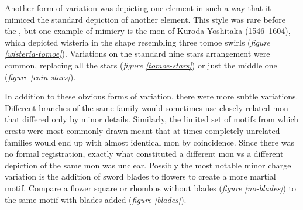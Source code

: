 \documentclass{article}
\begin{document}
  \begin{figure}[b]
  \begin{subfigs}
\end{subfigs}
\begin{subfigs}
  \end{subfigs}
\end{figure}

\clearpage

\begin{figure}[t]
  \begin{subfigs}
  \end{subfigs}
  \end{figure}

  Another form of variation was depicting one element in such a way
  that it mimiced the standard depiction of another element.  This
  style was rare before the \EdoPeriod, but one example of mimicry is
  the mon of Kuroda Yoshitaka (1546--1604), which depicted wisteria in
  the shape resembling three tomoe swirls (\emph{figure
  \ref{wisteria-tomoe}}). Variations on
  the standard nine stars arrangement were common,  replacing
  all the stars (\emph{figure
  \ref{tomoe-stars}}) or just the middle one (\emph{figure \ref{coin-stars}}).

  In addition to these obvious forms of variation, there were more
  subtle variations.  Different branches of the same family would
  sometimes use closely-related mon that differed only by minor
  details.  Similarly, the limited set of motifs from which crests
  were most commonly drawn meant that at times completely unrelated
  families would end up with almost identical mon by
  coincidence. Since there was no formal
  registration, exactly what constituted a different mon vs a
  different depiction of the same mon was unclear. Possibly the most notable
  minor charge variation is the addition of sword blades to flowers to
  create a more martial motif. Compare a flower square or rhombus without
  blades (\emph{figure \ref{no-blades}}) to the same motif with blades added (\emph{figure \ref{blades}}).
\end{document}
